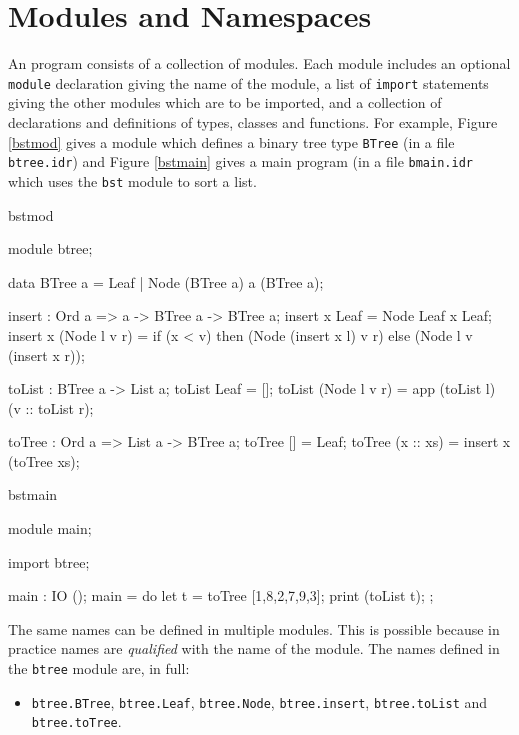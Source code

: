 \section{Modules and Namespaces}
\label{sect:namespaces}

An \Idris{} program consists of a collection of modules. Each module includes
an optional \texttt{module} declaration giving the name of the module, a
list of \texttt{import} statements giving the other modules which are to be imported,
and a collection of declarations and definitions of types, classes and functions.
For example, Figure \ref{bstmod} gives a module which defines a binary
tree type \texttt{BTree} (in a file \texttt{btree.idr}) and Figure
\ref{bstmain} gives a main program (in a file \texttt{bmain.idr} which uses the
\texttt{bst} module to sort a list.

\begin{SaveVerbatim}{bstmod}

module btree;

data BTree a = Leaf
             | Node (BTree a) a (BTree a);

insert : Ord a => a -> BTree a -> BTree a;
insert x Leaf = Node Leaf x Leaf;
insert x (Node l v r) = if (x < v) then (Node (insert x l) v r)
                                   else (Node l v (insert x r));

toList : BTree a -> List a;
toList Leaf = [];
toList (Node l v r) = app (toList l) (v :: toList r);

toTree : Ord a => List a -> BTree a;
toTree [] = Leaf;
toTree (x :: xs) = insert x (toTree xs);

\end{SaveVerbatim}

\begin{SaveVerbatim}{bstmain}

module main;

import btree;

main : IO ();
main = do { let t = toTree [1,8,2,7,9,3]; 
            print (toList t);
          };

\end{SaveVerbatim}

The same names can be defined in multiple modules. This is possible because in practice names
are \emph{qualified} with the name of the module. 
The names defined in the \texttt{btree} module are, in full:

\begin{itemize}
\item \texttt{btree.BTree}, \texttt{btree.Leaf}, \texttt{btree.Node}, \texttt{btree.insert},
\texttt{btree.toList} and \texttt{btree.toTree}.
\end{itemize}

